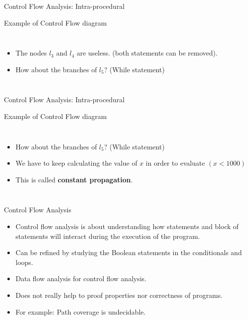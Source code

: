 \begin{frame}{Control Flow Analysis: Intra-procedural}
\begin{exampleblock}{Example of Control Flow diagram}
	\begin{columns}
		\footnotesize
			\begin{itemize}
			\item The nodes $l_3$ and $l_4$ are useless. (both statements can be removed).
			\item How about the branches of $l_5$? (While statement)
		\end{itemize}
		
		
	\end{columns}
\end{exampleblock}
\end{frame}



\begin{frame}{Control Flow Analysis: Intra-procedural}
\begin{exampleblock}{Example of Control Flow diagram}
	\begin{columns}
		\column{0.4\linewidth}
		\footnotesize
		\begin{itemize}
			\item How about the branches of $l_5$? (While statement)
			\item We have to keep calculating the value of $x$ in order to evaluate $(x<1000)$
			\item This is called \textbf{constant propagation}.
		\end{itemize}
		
		\column{0.6\linewidth}
		
	\end{columns}
\end{exampleblock}
\end{frame}

\begin{frame}{Control Flow Analysis}
\begin{itemize}
	\item Control flow analysis is about understanding how statements and block of statements will interact during the execution of the program.\\
	\item Can be refined by studying the Boolean statements in the conditionals and loops.
	\item Data flow analysis for control flow analysis.
	\item Does not really help to proof properties nor correctness of programs.
	\item For example: Path coverage is undecidable.
	
\end{itemize}
\end{frame}





